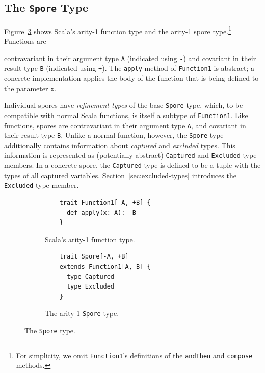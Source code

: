 \documentclass[runningheads]{llncs}
\begin{document}
\begin{sloppypar}
\vspace{2mm}
\subsection{The \texttt{Spore} Type}
\label{sec:spore-type}




Figure~\ref{fig:spore-type} shows Scala's arity-1 function type and the arity-1 spore type.\footnote{For simplicity, we omit \verb+Function1+'s definitions of the \verb+andThen+ and \verb+compose+ methods.}
Functions are
\pagebreak

\noindent contravariant in their argument type \verb|A| (indicated using
\verb|-|) and covariant in their result type \verb|B| (indicated
using \verb|+|). The \verb|apply| method of \verb|Function1| is abstract; a concrete implementation applies
the body of the function that is being defined to the parameter \verb|x|.

Individual spores have {\em refinement types} of the base \verb|Spore| type, which, to be compatible with normal Scala functions,
is itself a subtype of \verb|Function1|. Like functions, spores are contravariant in their argument type \verb|A|, and
covariant in their result type \verb|B|. Unlike a normal function,
however, the \verb|Spore| type additionally contains information about
\textit{captured} and \textit{excluded} types. This information is represented
as (potentially abstract) \verb|Captured| and \verb|Excluded| type members. In a
concrete spore, the \verb|Captured| type is defined to be a tuple with the types of all captured variables.
Section~\ref{sec:excluded-types} introduces the \verb|Excluded| type member.


\begin{figure}[b!]
\vspace{-6mm}
\begin{subfigure}{.5\textwidth}
  \centering
  \begin{lstlisting}
    trait Function1[-A, +B] {
      def apply(x: A):  B
    }
  \end{lstlisting}
  \caption{Scala's arity-1 function type.}
  \label{fig:function-arity1}
\end{subfigure}%
\begin{subfigure}{.5\textwidth}
  \centering
  \begin{lstlisting}
    trait Spore[-A, +B]
    extends Function1[A, B] {
      type Captured
      type Excluded
    }
  \end{lstlisting}
  \caption{The arity-1 \texttt{Spore} type.}
  \label{fig:spore-arity1}
\end{subfigure}%
\vspace{1mm}
\caption{The \texttt{Spore} type.}
\label{fig:spore-type}
\vspace{-2mm}
\end{figure}



\end{sloppypar}
\end{document}
